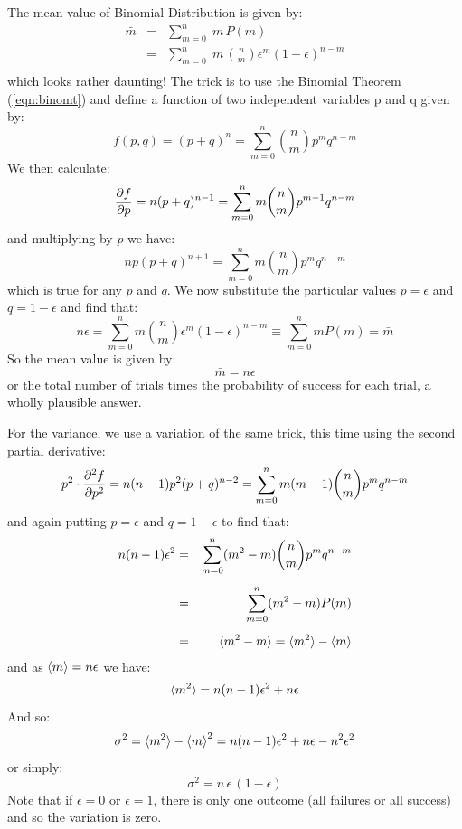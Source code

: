 \documentclass[12pt]{article}
\begin{document}
The mean value of Binomial Distribution is given by:
\begin{eqnarray*}
\bar{m} &=& \sum_{m=0}^n \; m \, P(m) \\
&=& \sum_{m=0}^n \; m \, \binom{n}{m} \epsilon^m (1-\epsilon)^{n-m} \\
\end{eqnarray*}
which looks rather daunting!  The trick is to use the Binomial Theorem (\ref{eqn:binomt}) and define a function of two independent variables p and q given by:
\begin{displaymath}
f(p,q) = (p+q)^n = \sum_{m=0}^n \binom{n}{m} p^m q^{n-m}
\end{displaymath}
We then calculate:
\begin{displaymath}
\frac{\partial f}{\partial p} = n(p+q)^{n-1} = \sum_{m=0}^n m \binom{n}{m} p^{m-1} q^{n-m} \\
\end{displaymath}
and multiplying by $p$ we have:
\begin{displaymath}
np(p+q)^{n+1} = \sum_{m=0}^n m \binom{n}{m} p^m q^{n-m}
\end{displaymath}
which is true for any $p$ and $q$.  We now substitute the particular values $p=\epsilon$ and $q=1-\epsilon$ and find that:
\begin{displaymath}
n \epsilon = \sum_{m=0}^n m \binom{n}{m} \epsilon^m (1-\epsilon)^{n-m} \equiv \sum_{m=0}^n m P(m) = \bar{m}
\end{displaymath}
So the mean value is given by:
\begin{equation}
\bar{m} = n \epsilon
\end{equation}
or the total number of trials times the probability of success for each trial, a wholly plausible answer.

For the variance, we use a variation of the same trick, this time using the second partial derivative:
\begin{displaymath}
p^2 \cdot \frac{\partial^2 f}{\partial p^2} = n(n-1)p^2(p+q)^{n-2} = \sum_{m=0}^n m (m-1) \binom{n}{m} p^{m} q^{n-m} \\
\end{displaymath}
and again putting $p=\epsilon$ and $q=1-\epsilon$ to find that:
\begin{eqnarray*}
n(n-1)\epsilon^2 &=& \sum_{m=0}^n (m^2 -m) \binom{n}{m} p^{m} q^{n-m} \\[5pt]
&=& \sum_{m=0}^n (m^2 -m) P(m) \\[5pt]
&=& \braket{m^2-m} = \braket{m^2}-\braket{m}
\end{eqnarray*}
and as $\braket{m} = n \epsilon$ we have:
\begin{displaymath}
\braket{m^2} = n(n-1)\epsilon^2 + n \epsilon
\end{displaymath}
And so:
\begin{displaymath}
\sigma^2 = \braket{m^2} - \braket{m}^2 = n(n-1)\epsilon^2 + n \epsilon - n^2\epsilon^2
\end{displaymath}
or simply:
\begin{equation}
\sigma^2 = n \, \epsilon \, (1 - \epsilon)
\end{equation}
Note that if $\epsilon=0$ or $\epsilon=1$, there is only one outcome (all failures or all success) and so the variation is zero.
\end{document}
